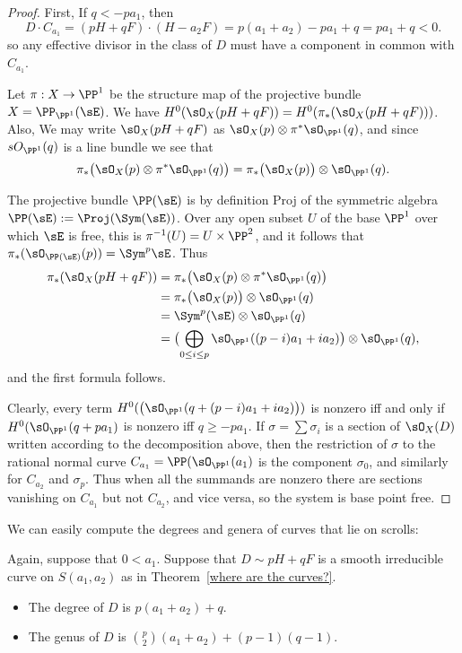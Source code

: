 \begin{proof} First, If $q<-pa_{1}$, then 
$$
D\cdot C_{a_{1}} = (pH+qF) \cdot (H-a_{2}F) = p(a_{1}+a_{2}) -pa_{1}+q = pa_{1}+q < 0.
$$
so any effective divisor in the class of $D$ must have a component in common with $C_{a_{1}}$.

Let $\pi:X\to \PP^{1}$ be the structure map of the projective bundle $X = \PP_{\PP^{1}}(\sE)$.
We have $H^{0}(\sO_{X}(pH+qF)) = H^{0}(\pi_{*}(\sO_{X}(pH+qF)))$. Also, 
We may write $\sO_{X}(pH+qF)$ as $\sO_{X}(p) \otimes \pi^{*}\sO_{\PP^{1}}(q)$, and since
$sO_{\PP^{1}}(q)$ is a line bundle we see that 
$$
\pi_{*}\bigl(\sO_{X}(p) \otimes \pi^{*}\sO_{\PP^{1}}(q)\bigr) 
 = \pi_{*}\bigl(\sO_{X}(p)\bigr)\otimes \sO_{\PP^{1}}(q).
$$

The projective bundle $\PP(\sE)$ is
by definition Proj of the symmetric algebra $\PP(\sE):=\Proj(\Sym(\sE))$. Over any open 
subset $U$ of the base $\PP^1$ over which $\sE$ is free, this is $\pi^{-1}(U) = U\times \PP^2$,
and it follows that $\pi_*(\sO_{\PP(\sE)}(p)) = \Sym^p\sE$. 
Thus 
\begin{align*}
\pi_{*}(\sO_{X}(pH+qF)) &= 
\pi_{*}\bigl(\sO_{X}(p) \otimes \pi^{*}\sO_{\PP^{1}}(q)\bigr) \\
 &= \pi_{*}\bigl(\sO_{X}(p)\bigr)\otimes \sO_{\PP^{1}}(q)\\
&=  \Sym^{p}(\sE)\otimes \sO_{\PP^{1}}(q)\\
&=  \bigl(\bigoplus_{0\leq i\leq p} \sO_{\PP^{1}}((p-i)a_{1}+i a_{2})\bigr) \otimes \sO_{\PP^{1}}(q),
\end{align*}
and the first formula follows. 

Clearly, every term 
$H^{0}(\bigl(\sO_{\PP^{1}}(q + (p-i)a_{1}+i a_{2})\bigr))$ is nonzero iff and only if 
$H^{0}(\sO_{\PP^{1}}(q + pa_{1})$ is nonzero iff $q\geq -pa_{1}$.
If $\sigma = \sum \sigma_i$ is a section of $\sO_X(D)$ written according to the decomposition
above, then the restriction of $\sigma$ to  the rational normal curve $C_{a_1} = \PP(\sO_{\PP^1}(a_1)$ is the component $\sigma_0$, and similarly for $C_{a_2}$ and $\sigma_p$. Thus when  all the summands are nonzero
there are sections  vanishing on $C_{a_{1}}$ but not $C_{a_{2}}$, and vice versa, so the system is base point free. 
\end{proof}

 
We can easily compute the degrees and genera of curves that lie on scrolls:

\begin{proposition}Again, suppose that $0<a_{1}$.
 Suppose that $D\sim pH+qF$ is a smooth irreducible curve on $S(a_{1}, a_{2})$ as in Theorem~\ref{where are the curves?}. 
\begin{itemize}
 \item The degree of $D$ is $p(a_{1}+a_{2}) +q$.
 \item The genus of $D$ is ${p\choose 2}(a_{1}+a_{2}) + (p-1)(q-1)$.
\end{itemize}
\end{proposition}
  
